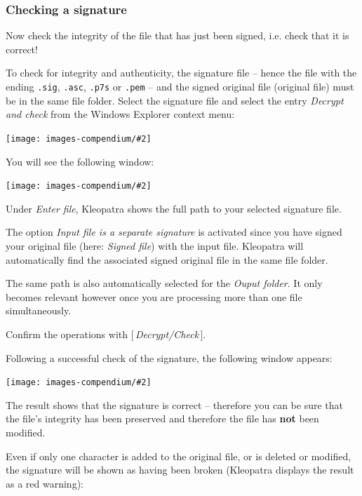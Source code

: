 \documentclass[a4paper,11pt,oneside,openright,titlepage]{scrbook}
\newcommand{\Button}[1]{[\,\textit{#1}\,]}
\newcommand{\Menu}[1]{\textit{#1}}
\newcommand{\Filename}[1]{\small{\texttt{#1}}\normalsize}
\newcommand{\IncludeImage}[2][]{
\begin{center}
  \texttt{[image: images-compendium/\#2]}%
\end{center}
}
\begin{document}
\clearpage
\subsubsection{Checking a signature}

Now check the integrity of the file that has just been signed, i.e.
check that it is correct!

To check for integrity and authenticity, the signature file -- hence
the file with the ending \Filename{.sig}, \Filename{.asc},
\Filename{.p7s} or \Filename{.pem} -- and the signed original file
(original file) must be in the same file folder.  Select the signature
file and select the entry \Menu{Decrypt and check} from the Windows
Explorer context menu:

\IncludeImage[width=0.3\textwidth]{sc-gpgex-contextmenu-verifyDecrypt_en}

\clearpage
You will see the following window:

\IncludeImage[width=0.85\textwidth]{sc-kleopatra-verifyFile1_en}

Under \Menu{Enter file}, Kleopatra shows the full path to your
selected signature file.

The option \Menu{Input file is a separate signature} is activated
since you have signed your original file (here: \Menu{Signed file})
with the input file.  Kleopatra will automatically find the associated
signed original file in the same file folder.

The same path is also automatically selected for the \Menu{Ouput
folder}. It only becomes relevant however once you are processing more
than one file simultaneously.

Confirm the operations with \Button{Decrypt/Check}.

\clearpage
Following a successful check of the signature, the following window appears:

\IncludeImage[width=0.85\textwidth]{sc-kleopatra-verifyFile2_en}

The result shows that the signature is correct -- therefore you can be
sure that the file's integrity has been preserved and therefore the
file has \textbf{not} been modified.

\clearpage
Even if only one character is added to the original file, or is deleted or modified, the signature will be shown as having been broken
(Kleopatra displays the result as a red warning):
\end{document}
